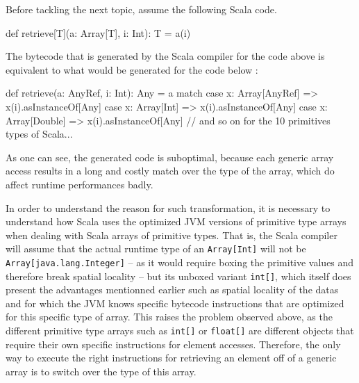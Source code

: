 
Before tackling the next topic, assume the following Scala code.

\begin{lstlisting-nobreak}
  def retrieve[T](a: Array[T], i: Int): T = {
    a(i)
  }
\end{lstlisting-nobreak}

The bytecode that is generated by the Scala compiler for the code above is equivalent to what would be generated for the code below : 

\begin{lstlisting-nobreak}
  def retrieve(a: AnyRef, i: Int): Any = {
    a match {
      case x: Array[AnyRef] => x(i).asInstanceOf[Any]
      case x: Array[Int] => x(i).asInstanceOf[Any]
      case x: Array[Double] => x(i).asInstanceOf[Any]
      // and so on for the 10 primitives types of Scala...
    }
  }
\end{lstlisting-nobreak}

As one can see, the generated code is suboptimal, because each generic array access results in a long and costly match over the type of the array, which do affect runtime performances badly.  


In order to understand the reason for such transformation, it is necessary to understand how Scala uses the optimized JVM versions of primitive type arrays when dealing with Scala arrays of primitive types. That is, the Scala compiler will assume that the actual runtime type of an \lstinline|Array[Int]| will not be \lstinline|Array[java.lang.Integer]| -- as it would require boxing the primitive values and therefore break spatial locality -- but its unboxed variant \lstinline|int[]|, which itself does present the advantages mentionned earlier such as spatial locality of the datas and for which the JVM knows specific bytecode instructions that are optimized for this specific type of array. This raises the problem observed above, as the different primitive type arrays such as \lstinline|int[]| or \lstinline|float[]| are different objects that require their own specific instructions for element accesses. Therefore, the only way to execute the right instructions for retrieving an element off of a generic array is to switch over the type of this array.

